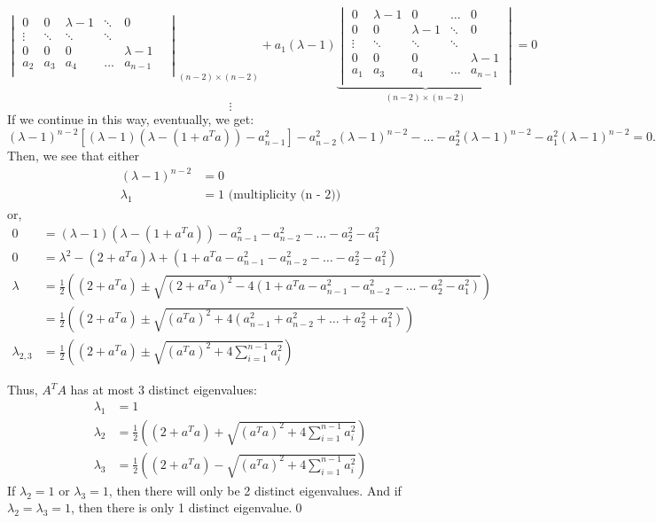 \documentclass[12pt]{article}
\begin{document}
\begin{itemize}
$${{\begin{vmatrix}
					0 & 0 & \lambda - 1 & \ddots & 0 \\
					\vdots & \ddots & \ddots & \ddots &  \\
					0 & 0 & 0 &  & \lambda - 1 & \\
					a_2 & a_3 & a_4 & \hdots & a_{n-1} \\
					\end{vmatrix}}_{(n-2)\times(n-2)} 
 + a_1(\lambda - 1)\underbrace{\begin{vmatrix}
	0 & \lambda - 1 & 0 & \hdots & 0 \\
	0 & 0 & \lambda - 1 & \ddots & 0 \\
	\vdots & \ddots & \ddots & \ddots &  \\
	0 & 0 & 0 &  & \lambda - 1 \\
	a_1 & a_3 & a_4 &  \hdots & a_{n-1} \\
	\end{vmatrix}}_{(n-2)\times(n-2)} = 0} $$
$$\vdots$$
If we continue in this way, eventually, we get:
$$(\lambda - 1)^{n-2}[(\lambda - 1)(\lambda - (1+a^Ta))-a_{n-1}^2] - a_{n-2}^2(\lambda - 1)^{n-2} - \hdots - a_2^2(\lambda - 1)^{n-2} - a_1^2(\lambda - 1)^{n-2} = 0.$$
Then, we see that either
\begin{align}
(\lambda - 1)^{n-2} &= 0 \nonumber \\
\lambda_1 &= 1 \text{ (multiplicity (n - 2))} \nonumber
\end{align}
or,
\begin{align}
0 &= (\lambda - 1)(\lambda - (1+a^Ta)) - a_{n-1}^2 - a_{n-2}^2 - \dots - a_2^2 - a_1^2 \nonumber \\
0 &= \lambda^2 - (2 + a^Ta)\lambda + (1 + a^Ta - a_{n-1}^2 - a_{n-2}^2 - \dots - a_2^2 - a_1^2) \nonumber \\
\lambda &= \frac{1}{2}\left((2+a^Ta) \pm \sqrt{(2+a^Ta)^2 - 4(1+a^Ta - a_{n-1}^2 - a_{n-2}^2 - \dots - a_2^2 - a_1^2)}\right) \nonumber \\
&= \frac{1}{2}\left((2+a^Ta) \pm \sqrt{(a^Ta)^2 + 4(a_{n-1}^2 + a_{n-2}^2 + \dots + a_2^2 + a_1^2)}\right) \nonumber \\
\lambda_{2,3} &= \frac{1}{2}\left((2+a^Ta) \pm \sqrt{(a^Ta)^2 + 4\sum\limits_{i=1}^{n-1} a_i^2}\right) \nonumber
\end{align}

Thus, $A^TA$ has at most 3 distinct eigenvalues:
\begin{align}
\lambda_1 &= 1 \nonumber \\
\lambda_2 &= \frac{1}{2}\left((2+a^Ta) + \sqrt{(a^Ta)^2 + 4\sum\limits_{i=1}^{n-1} a_i^2}\right) \nonumber \\
\lambda_3 &= \frac{1}{2}\left((2+a^Ta) - \sqrt{(a^Ta)^2 + 4\sum\limits_{i=1}^{n-1} a_i^2}\right) \nonumber
\end{align}
If $\lambda_2 = 1$ or $\lambda_3 = 1$, then there will only be 2 distinct eigenvalues. And if $\lambda_2 = \lambda_3 = 1$, then there is only 1 distinct eigenvalue.\qed\\



\end{itemize}
\end{document}
